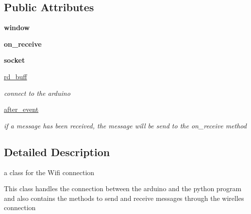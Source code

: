\subsection*{Public Attributes}
\begin{DoxyCompactItemize}
\item 
\mbox{\label{class_python___client_1_1_wifi_connect_a56ccc377926c457d236d91b299776574}} 
{\bfseries window}
\item 
\mbox{\label{class_python___client_1_1_wifi_connect_a95b489d481322d5a7b320095dd13d563}} 
{\bfseries on\+\_\+receive}
\item 
\mbox{\label{class_python___client_1_1_wifi_connect_a86da1a7e9cf31bd8085061341ab4e6b7}} 
{\bfseries socket}
\item 
\mbox{\label{class_python___client_1_1_wifi_connect_a70bd3f97800dff409d3773c07bdb98d6}} 
\mbox{\hyperlink{class_python___client_1_1_wifi_connect_a70bd3f97800dff409d3773c07bdb98d6}{rd\+\_\+buff}}
\begin{DoxyCompactList}\small\item\em connect to the arduino \end{DoxyCompactList}\item 
\mbox{\label{class_python___client_1_1_wifi_connect_aeb42d01979f3311563dbcc9a3d027b99}} 
\mbox{\hyperlink{class_python___client_1_1_wifi_connect_aeb42d01979f3311563dbcc9a3d027b99}{after\+\_\+event}}
\begin{DoxyCompactList}\small\item\em if a message has been received, the message will be send to the on\+\_\+receive method \end{DoxyCompactList}\end{DoxyCompactItemize}


\subsection{Detailed Description}
a class for the Wifi connection 

This class handles the connection between the arduino and the python program and also contains the methods to send and receive messages through the wirelles connection 

